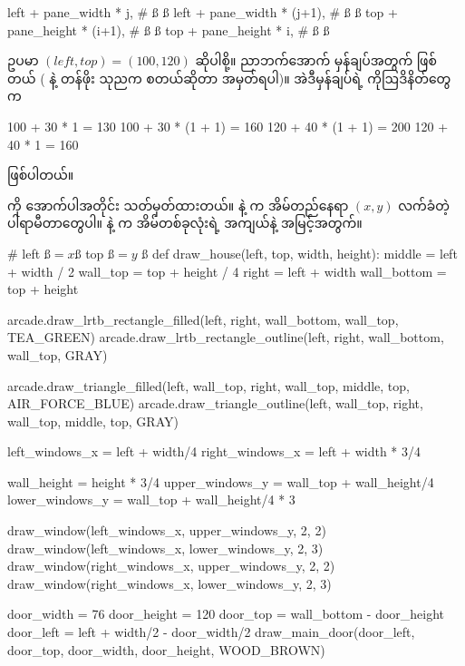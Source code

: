 \begin{py}
left + pane_width * j,          # ß ß
left + pane_width * (j+1),      # ß ß
top + pane_height * (i+1),      # ß ß
top + pane_height * i,          # ß ß
\end{py}
ဥပမာ $(left, top) = (100, 120)$ ဆိုပါစို့။ ညာဘက်အောက် မှန်ချပ်အတွက် \fEn{,}  ဖြစ်တယ် ( နဲ့   တန်ဖိုး သုညက စတယ်ဆိုတာ အမှတ်ရပါ)။ အဲဒီမှန်ချပ်ရဲ့ ကိုဩဒိနိတ်တွေက
\begin{codetxt}
100 + 30 * 1            = 130
100 + 30 * (1 + 1)      = 160 
120 + 40 * (1 + 1)      = 200
120 + 40 * 1            = 160
\end{codetxt}
ဖြစ်ပါတယ်။ 

 ကို အောက်ပါအတိုင်း သတ်မှတ်ထားတယ်။  နဲ့  က အိမ်တည်နေရာ $(x, y)$ လက်ခံတဲ့ ပါရာမီတာတွေပါ။  နဲ့  က အိမ်တစ်ခုလုံးရဲ့ အကျယ်နဲ့ အမြင့်အတွက်။ 
%
\begin{py}
# left ß$= x$ß top ß$= y$ ß
def draw_house(left, top, width, height):
    middle = left + width / 2
    wall_top = top + height / 4
    right = left + width
    wall_bottom = top + height

    arcade.draw_lrtb_rectangle_filled(left, right,
                                      wall_bottom, wall_top,
                                      TEA_GREEN)
    arcade.draw_lrtb_rectangle_outline(left, right,
                                       wall_bottom, wall_top,
                                       GRAY)

    arcade.draw_triangle_filled(left, wall_top, 
                                right, wall_top, 
                                middle, top,
                                AIR_FORCE_BLUE)
    arcade.draw_triangle_outline(left, wall_top,
                                 right, wall_top,
                                 middle, top,
                                 GRAY)

    left_windows_x = left + width/4
    right_windows_x = left + width * 3/4

    wall_height = height * 3/4
    upper_windows_y = wall_top + wall_height/4
    lower_windows_y = wall_top + wall_height/4 * 3

    draw_window(left_windows_x, upper_windows_y, 2, 2)
    draw_window(left_windows_x, lower_windows_y, 2, 3)
    draw_window(right_windows_x, upper_windows_y, 2, 2)
    draw_window(right_windows_x, lower_windows_y, 2, 3)

    door_width = 76
    door_height = 120
    door_top = wall_bottom - door_height
    door_left = left + width/2 - door_width/2
    draw_main_door(door_left, door_top, 
                   door_width, door_height, 
                   WOOD_BROWN)
\end{py}
